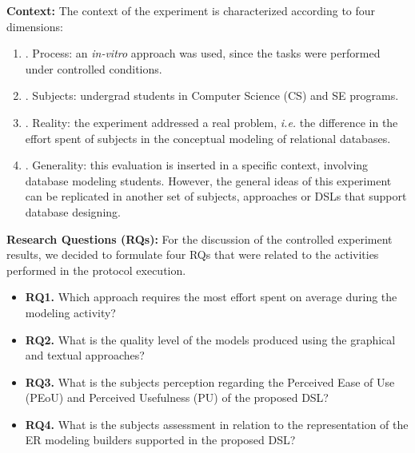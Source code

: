 \textbf{Context:}
The context of the experiment is characterized according to four dimensions:
\begin{enumerate}[label=\roman*]
    \item. Process: an \textit{in-vitro} approach was used, since the tasks were performed under controlled conditions.
    \item. Subjects: undergrad students in Computer Science (CS) and SE programs.
    \item. Reality: the experiment addressed a real problem, \textit{i.e.} the difference in the effort spent of subjects in the conceptual modeling of relational databases. 
    \item. Generality: this evaluation is inserted in a specific context, involving database modeling students.
    However, the general ideas of this experiment can be replicated in another set of subjects, approaches or DSLs that support database designing.
\end{enumerate}

\textbf{Research Questions (RQs):}
For the discussion of the controlled experiment results, we decided to formulate four RQs that were related to the activities performed in the protocol execution.
\begin{itemize}
    \item \textbf{RQ1.} Which approach requires the most effort spent on average during the modeling activity?
    \item \textbf{RQ2.} What is the quality level of the models produced using the graphical and textual approaches?
    \item \textbf{RQ3.} What is the subjects perception regarding the Perceived Ease of Use (PEoU) and Perceived Usefulness (PU) of the proposed DSL?
    \item \textbf{RQ4.} What is the subjects assessment in relation to the representation of the ER modeling builders supported in the proposed DSL?
\end{itemize}

